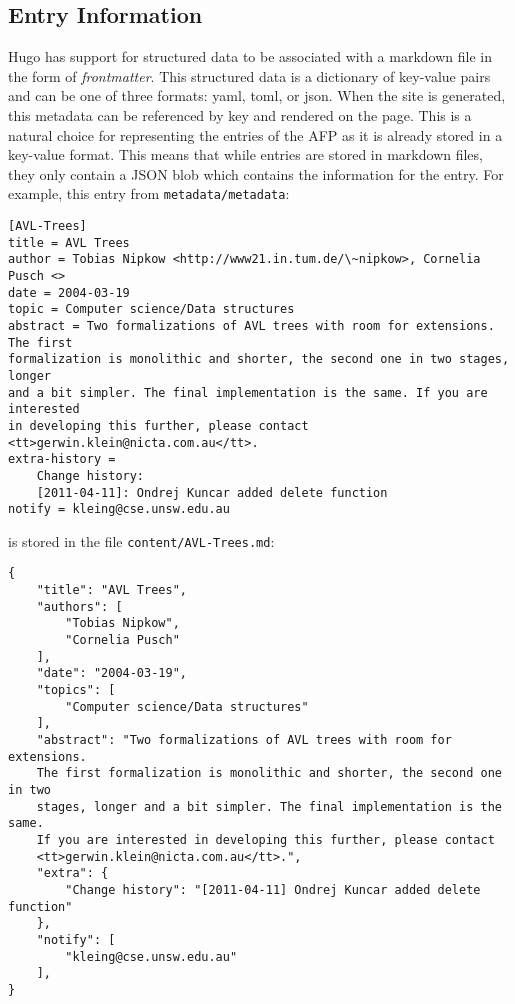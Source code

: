 \documentclass[bsc,frontabs,oneside,singlespacing,parskip,deptreport,logo]{infthesis}
\begin{document}
\subsection{Entry Information} \label{entry-information}

Hugo has support for structured data to be associated with a markdown file in the form of \emph{frontmatter}. This structured data is a dictionary of key-value pairs and can be one of three formats: yaml, toml, or json. When the site is generated, this metadata can be referenced by key and rendered on the page. This is a natural choice for representing the entries of the AFP as it is already stored in a key-value format. This means that while entries are stored in markdown files, they only contain a JSON blob which contains the information for the entry. For example, this entry from \verb|metadata/metadata|: 

{\footnotesize
\begin{verbatim}
[AVL-Trees]
title = AVL Trees
author = Tobias Nipkow <http://www21.in.tum.de/\~nipkow>, Cornelia Pusch <>
date = 2004-03-19
topic = Computer science/Data structures
abstract = Two formalizations of AVL trees with room for extensions. The first 
formalization is monolithic and shorter, the second one in two stages, longer 
and a bit simpler. The final implementation is the same. If you are interested 
in developing this further, please contact <tt>gerwin.klein@nicta.com.au</tt>.
extra-history =
    Change history:
    [2011-04-11]: Ondrej Kuncar added delete function
notify = kleing@cse.unsw.edu.au
\end{verbatim}
}

is stored in the file \verb|content/AVL-Trees.md|:

{\footnotesize
\begin{verbatim}
{
    "title": "AVL Trees",
    "authors": [
        "Tobias Nipkow",
        "Cornelia Pusch"
    ],
    "date": "2004-03-19",
    "topics": [
        "Computer science/Data structures"
    ],
    "abstract": "Two formalizations of AVL trees with room for extensions. 
    The first formalization is monolithic and shorter, the second one in two 
    stages, longer and a bit simpler. The final implementation is the same. 
    If you are interested in developing this further, please contact 
    <tt>gerwin.klein@nicta.com.au</tt>.",
    "extra": {
        "Change history": "[2011-04-11] Ondrej Kuncar added delete function"
    },
    "notify": [
        "kleing@cse.unsw.edu.au"
    ],
}
\end{verbatim}
}
\end{document}
